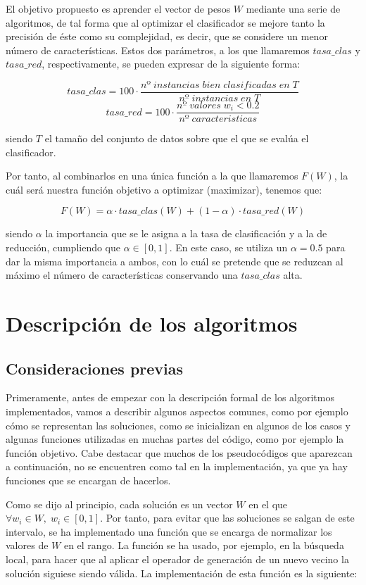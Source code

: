 \documentclass[11pt,a4paper]{article}
\begin{document}
El objetivo propuesto es aprender el vector de pesos $W$
mediante una serie de algoritmos, de tal forma que al optimizar el clasificador se mejore tanto la precisión de éste como su
complejidad, es decir, que se considere un menor número de características. Estos dos parámetros, a los que llamaremos $tasa\_
clas$ y $tasa\_red$, respectivamente, se pueden expresar de la siguiente forma:

\[tasa\_clas = 100 \cdot \frac{nº \; instancias \; bien \; clasificadas \; en \; T}{nº \; instancias \; en \; T}\]
\[tasa\_red = 100 \cdot \frac{nº \; valores \; w_i < 0.2}{nº \; caracteristicas}\]

\noindent siendo $T$ el tamaño del conjunto de datos sobre que el que se evalúa el clasificador.\par

Por tanto, al combinarlos en una única función a la que llamaremos $F(W)$, la cuál será nuestra función objetivo a optimizar
(maximizar), tenemos que:

\[F(W) = \alpha \cdot tasa\_clas(W) + (1 - \alpha) \cdot tasa\_red(W)\] 

\noindent siendo $\alpha$ la importancia que se le asigna a la tasa de clasificación y a la de reducción, cumpliendo que
$\alpha \in [0, 1]$. En este caso, se utiliza un $\alpha = 0.5$ para dar la misma importancia a ambos, con lo cuál se pretende
que se reduzcan al máximo el número de características conservando una $tasa\_clas$ alta.

\section{Descripción de los algoritmos}

\subsection{Consideraciones previas}

Primeramente, antes de empezar con la descripción formal de los algoritmos implementados, vamos a describir algunos aspectos
comunes, como por ejemplo cómo se representan las soluciones, como se inicializan en algunos de los casos y algunas funciones
utilizadas en muchas partes del código, como por ejemplo la función objetivo. Cabe destacar que muchos de los pseudocódigos
que aparezcan a continuación, no se encuentren como tal en la implementación, ya que ya hay funciones que se encargan de
hacerlos.

Como se dijo al principio, cada solución es un vector $W$ en el que $\forall w_i \in W, \; w_i \in [0, 1]$. Por tanto, para
evitar que las soluciones se salgan de este intervalo, se ha implementado una función que se encarga de normalizar los valores
de $W$ en el rango. La función se ha usado, por ejemplo, en la búsqueda local, para hacer que al aplicar el operador
de generación de un nuevo vecino la solución siguiese siendo válida. La implementación de esta función es la siguiente:
\end{document}
